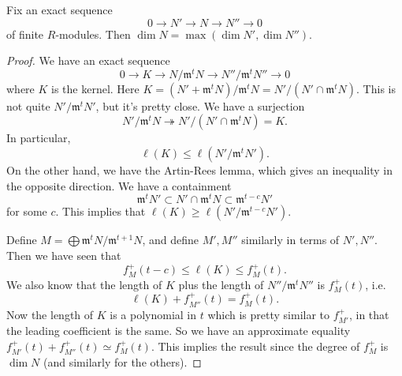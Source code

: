 \begin{proposition} \label{dimexactseq}
Fix an exact sequence
\[ 0 \to N' \to N \to N'' \to 0  \]
of finite $R$-modules. Then $\dim N = \max (\dim N', \dim N'')$.
\end{proposition} 
\begin{proof} 
We have an exact sequence
\[ 0 \to K \to N/\mathfrak{m}^t N \to N''/\mathfrak{m}^t N'' \to 0  \]
where $K$ is the kernel. Here $K = (N' + \mathfrak{m}^t N)/ \mathfrak{m}^t N
= N'/( N' \cap \mathfrak{m}^t N)$. This is not quite $N'/\mathfrak{m}^t N'$,
but it's pretty close. 
We have a surjection
\[ N'/\mathfrak{m}^t N \twoheadrightarrow N'/(N' \cap \mathfrak{m}^t N) = K. \]
In particular, 
\[ \ell(K) \leq \ell(N'/\mathfrak{m}^t N').  \]
On the other hand, we have the Artin-Rees lemma, which gives an inequality in
the opposite direction. We have a containment
\[ \mathfrak{m}^t N' \subset N' \cap \mathfrak{m}^t N \subset
\mathfrak{m}^{t-c} N'  \]
for some $c$. This implies that $\ell(K) \geq \ell( N'/\mathfrak{m}^{t-c} N')$. 

Define $M = \bigoplus \mathfrak{m}^t N/\mathfrak{m}^{t+1} N$, and define $M',
M''$ similarly in terms of $N', N''$. Then we have seen that 
\[ \boxed{f_M^+(t-c) \leq \ell(K) \leq f_M^+(t).}  \]
We also know that the length of $K$ plus the length of $N''/\mathfrak{m}^t N''$
is $f_M^+(t)$, i.e.
\[ \ell(K) + f_{M''}^+(t) = f_M^+(t).  \]
Now the length of $K$ is a polynomial in $t$ which is pretty similar to
$f_{M'}^+$, in that the leading coefficient is the same. So we have an
approximate equality $f_{M'}^+(t) + f_{M''}^+(t) \simeq f_M^+(t)$. This implies the
result since the degree of $f_M^+$ is $\dim N$ (and similarly for the others). 
\end{proof} 



